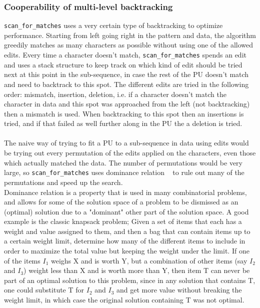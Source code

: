 \documentclass[12pt]{article}
\newcommand{\scm}{\texttt{scan\_for\_matches} }
\newcommand{\pu}{PU }
\begin{document}
\subsubsection{Cooperability of multi-level backtracking}
\scm uses a very certain type of backtracking to optimize performance. Starting from left going right in the pattern
and data, the algorithm greedily matches as many characters as possible without using one of the allowed edits.
Every time a character doesn't match, \scm spends an edit and uses a stack structure to keep track on which
kind of edit should be tried next at this point in the sub-sequence, in case the rest of the \pu doesn't match and need to
backtrack to this spot. The different edits are tried in the following order: mismatch, insertion, deletion, i.e.
if a character doesn't match the character in data and this spot was approached from the left (not backtracking)
then a mismatch is used. When backtracking to this spot then an insertions is tried, and if that failed as well further along 
in the \pu the a deletion is tried. \\ \\
The naive way of trying to fit a \pu to a sub-sequence in data using edits would be trying out every permutation of the edits
applied on the characters, even those which actually matched the data. The number of permutations would be very large,
so \scm uses dominance relation ~\cite{dom} to rule out many of the permutations and speed up the search. \\
Dominance relation is a property that is used in many combinatorial problems, and allows for some of the solution
space of a problem to be dismissed as an (optimal) solution due to a "dominant" other part of the solution space. 
A good example is the classic knapsack problem; Given a set of items that each has a weight and value assigned to them,
and then a bag that can contain items up to a certain weight limit, determine how many of the different items to
include in order to maximize the total value but keeping the weight under the limit. If one of the items $I_1$ weighs
X and is worth Y, but a combination of other items (say $I_2$ and $I_3$) weight less than X and is worth more than Y, 
then item T can never be part of an optimal solution to this problem, since in any solution that contains T, 
one could substitute T for $I_2$ and $I_3$ and get more value without breaking the weight limit, in which case the 
original solution containing T was not optimal. \\ \\
\end{document}
